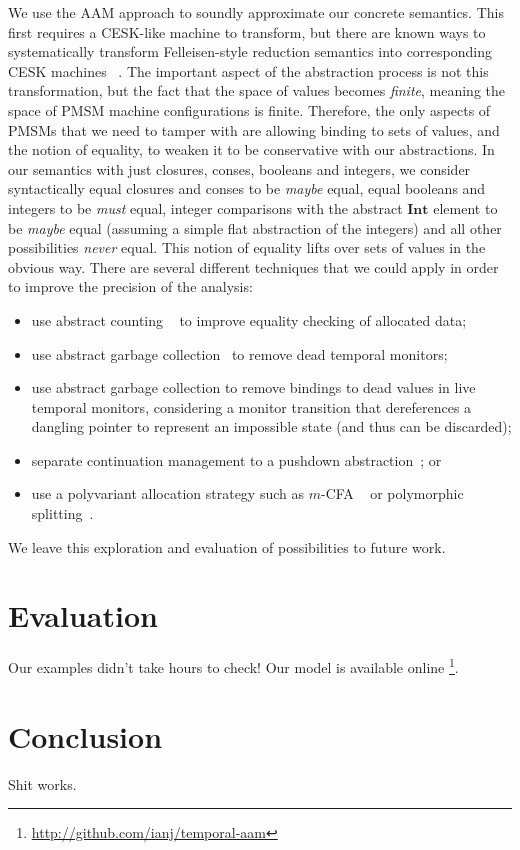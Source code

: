 We use the AAM approach to soundly approximate our concrete semantics.
%
This first requires a CESK-like machine to transform, but there are known ways to systematically transform Felleisen-style reduction semantics into corresponding CESK machines ~\citep{?}.
%
The important aspect of the abstraction process is not this transformation, but the fact that the space of values becomes \emph{finite}, meaning the space of PMSM machine configurations is finite.
%
Therefore, the only aspects of PMSMs that we need to tamper with are allowing binding to sets of values, and the notion of equality, to weaken it to be conservative with our abstractions.
%
In our semantics with just closures, conses, booleans and integers, we consider syntactically equal closures and conses to be \emph{maybe} equal, equal booleans and integers to be \emph{must} equal, integer comparisons with the abstract $\mathbf{Int}$ element to be \emph{maybe} equal (assuming a simple flat abstraction of the integers) and all other possibilities \emph{never} equal.
%
This notion of equality lifts over sets of values in the obvious way.
%
There are several different techniques that we could apply in order to improve the precision of the analysis:
\begin{itemize}
\item{use abstract counting ~\citep{dvanhorn:Might:2006:GammaCFA} to improve equality checking of allocated data;}
\item{use abstract garbage collection~\citep{dvanhorn:Might:2006:GammaCFA} to remove dead temporal monitors;}
\item{use abstract garbage collection to remove bindings to dead values in live temporal monitors, considering a monitor transition that dereferences a dangling pointer to represent an impossible state (and thus can be discarded);}
\item{separate continuation management to a pushdown abstraction~\citep{dvanhorn:Vardoulakis2011CFA2}; or}
\item{use a polyvariant allocation strategy such as $m$-CFA ~\citep{dvanhorn:Might2010Resolving} or polymorphic splitting~\citep{dvanhorn:wright-jagannathan-toplas98}.}
\end{itemize}
%
We leave this exploration and evaluation of possibilities to future work.

\section{Evaluation}

Our examples didn't take hours to check!
%
Our model is available online \footnote{\url{http://github.com/ianj/temporal-aam}}.

\section{Conclusion}

Shit works.
